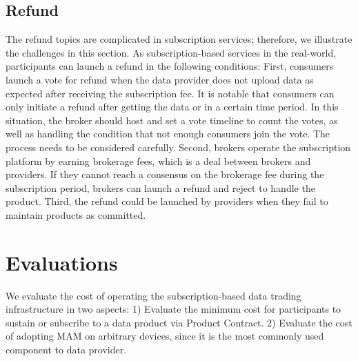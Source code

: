 \documentclass[10pt, conference, compsocconf]{IEEEtran}
\begin{document}
\subsection{Refund}
\label{section:refund}
The refund topics are complicated in subscription services; therefore, we illustrate the challenges in this section. As subscription-based services in the real-world, participants can launch a refund in the following conditions: First, consumers launch a vote for refund when the data provider does not upload data as expected after receiving the subscription fee. It is notable that consumers can only initiate a refund after getting the data or in a certain time period. In this situation, the broker should host and set a vote timeline to count the votes, as well as handling the condition that not enough consumers join the vote. The process needs to be considered carefully. Second, brokers operate the subscription platform by earning brokerage fees, which is a deal between brokers and providers. If they cannot reach a consensus on the brokerage fee during the subscription period, brokers can launch a refund and reject to handle the product. Third, the refund could be launched by providers when they fail to maintain products as committed.

\section{Evaluations}
\label{section:evaluation}
We evaluate the cost of operating the subscription-based data trading infrastructure in two aspects: 1) Evaluate the minimum cost for participants to sustain or subscribe to a data product via Product Contract. 2) Evaluate the cost of adopting MAM on arbitrary devices, since it is the most commonly used component to data provider.
\end{document}
